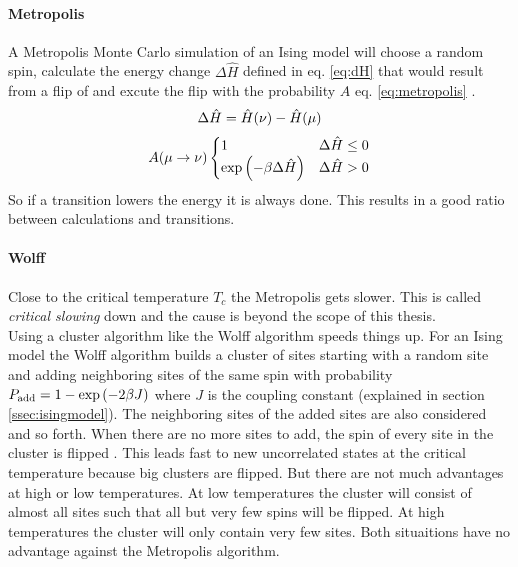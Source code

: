     \paragraph{Metropolis}
        A Metropolis Monte Carlo simulation of an Ising model will
        choose a random spin, calculate the energy change
        \(\Delta \hat H\) defined in eq. \eqref{eq:dH} that would result
        from a flip of and excute the flip with the probability \(A\)
        eq. \eqref{eq:metropolis} \cite{NewmanBarkema1999} \cite{Katzgraber2011}.
        \begin{equation}
            \Delta \hat H = \hat H(\nu) - \hat H(\mu)\\
            \label{eq:dH}
        \end{equation}
        \begin{equation}
            A(\mu \to \nu)
            \begin{cases}
                1                                 & \Delta \hat H \le 0 \\
                \exp{\ensuremath{\left(-\beta \Delta \hat H\right)}} & \Delta \hat H > 0
            \end{cases}
            \label{eq:metropolis}
        \end{equation}
        So if a transition lowers the energy it is always done. This
        results in a good ratio between calculations and transitions.

    \paragraph{Wolff}
        Close to the critical temperature \(T_c\) the Metropolis
        gets slower. This is called \emph{critical slowing} down and the
        cause is beyond the scope of this thesis.\\
        Using a cluster algorithm like the Wolff
        algorithm \cite{Wolff1989} speeds things up.
        For an Ising model the Wolff algorithm builds a cluster of sites
        starting with a random site and adding neighboring sites of the
        same spin with probability
        \(P_{\mathrm{add}} = 1-\exp\left(-2\beta J\right)\)
        where \(J\) is the coupling constant (explained in section
        \ref{ssec:isingmodel}). The neighboring sites of the added sites
        are also considered and so forth. When there are no more sites
        to add, the spin of every site in the cluster is flipped
        \cite[S. ??]{NewmanBarkema1999} \cite[S. 151f]{Katzgraber2011}.
        This leads fast to new uncorrelated states at the critical
        temperature because big clusters are flipped. But there are not
        much advantages at high or low temperatures. At low temperatures
        the cluster will consist of almost all sites such that all but
        very few spins will be flipped. At high temperatures the cluster
        will only contain very few sites.
        Both situaitions have no advantage against the Metropolis algorithm.


